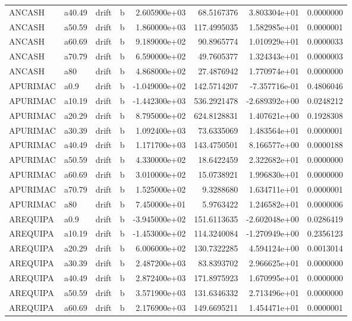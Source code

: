 \documentclass[
]{article}
\begin{document}
\begin{table}[!h]
\begin{tabular}[t]{llllrrrr}
ANCASH & a40.49 & drift & b & 2.605900e+03 & 68.5167376 & 3.803304e+01 & 0.0000000\\
ANCASH & a50.59 & drift & b & 1.860000e+03 & 117.4995035 & 1.582985e+01 & 0.0000001\\
ANCASH & a60.69 & drift & b & 9.189000e+02 & 90.8965774 & 1.010929e+01 & 0.0000033\\
\addlinespace
ANCASH & a70.79 & drift & b & 6.590000e+02 & 49.7605377 & 1.324343e+01 & 0.0000003\\
ANCASH & a80 & drift & b & 4.868000e+02 & 27.4876942 & 1.770974e+01 & 0.0000000\\
APURIMAC & a0.9 & drift & b & -1.049000e+02 & 142.5714207 & -7.357716e-01 & 0.4806046\\
APURIMAC & a10.19 & drift & b & -1.442300e+03 & 536.2921478 & -2.689392e+00 & 0.0248212\\
APURIMAC & a20.29 & drift & b & 8.795000e+02 & 624.8128831 & 1.407621e+00 & 0.1928308\\
\addlinespace
APURIMAC & a30.39 & drift & b & 1.092400e+03 & 73.6335069 & 1.483564e+01 & 0.0000001\\
APURIMAC & a40.49 & drift & b & 1.171700e+03 & 143.4750501 & 8.166577e+00 & 0.0000188\\
APURIMAC & a50.59 & drift & b & 4.330000e+02 & 18.6422459 & 2.322682e+01 & 0.0000000\\
APURIMAC & a60.69 & drift & b & 3.010000e+02 & 15.0738921 & 1.996830e+01 & 0.0000000\\
APURIMAC & a70.79 & drift & b & 1.525000e+02 & 9.3288680 & 1.634711e+01 & 0.0000001\\
\addlinespace
APURIMAC & a80 & drift & b & 7.450000e+01 & 5.9763422 & 1.246582e+01 & 0.0000006\\
AREQUIPA & a0.9 & drift & b & -3.945000e+02 & 151.6113635 & -2.602048e+00 & 0.0286419\\
AREQUIPA & a10.19 & drift & b & -1.453000e+02 & 114.3240084 & -1.270949e+00 & 0.2356123\\
AREQUIPA & a20.29 & drift & b & 6.006000e+02 & 130.7322285 & 4.594124e+00 & 0.0013014\\
AREQUIPA & a30.39 & drift & b & 2.487200e+03 & 83.8393702 & 2.966625e+01 & 0.0000000\\
\addlinespace
AREQUIPA & a40.49 & drift & b & 2.872400e+03 & 171.8975923 & 1.670995e+01 & 0.0000000\\
AREQUIPA & a50.59 & drift & b & 3.571900e+03 & 131.6346332 & 2.713496e+01 & 0.0000000\\
AREQUIPA & a60.69 & drift & b & 2.176900e+03 & 149.6695211 & 1.454471e+01 & 0.0000001\\

\end{tabular}
\end{table}
\end{document}
